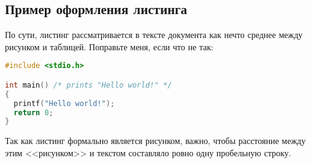 \newpage

\subsection{Пример оформления листинга}

По сути, листинг рассматривается в тексте документа как нечто среднее между рисунком и таблицей. Поправьте меня, если что не так: 
\begin{lstlisting}[language=c,caption=Исходный код какой-то программы на C]
#include <stdio.h>

int main() /* prints "Hello world!" */
{ 
  printf("Hello world!"); 
  return 0;
}
\end{lstlisting}
Так как листинг формально является рисунком, важно, чтобы расстояние
между этим <<рисунком>> и текстом составляло ровно одну пробельную строку.

